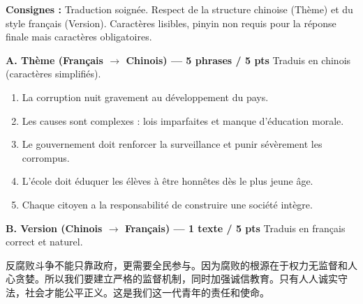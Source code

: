 \documentclass[11pt]{article}
\begin{document}
\begin{exercice}
\textbf{Consignes :} Traduction soignée. Respect de la structure chinoise (Thème) et du style français (Version). Caractères lisibles, pinyin non requis pour la réponse finale mais caractères obligatoires.

\textbf{A. Thème (Français $\rightarrow$ Chinois) — 5 phrases / 5 pts}
Traduis en chinois (caractères simplifiés).
\begin{enumerate}
    \item La corruption nuit gravement au développement du pays.
    \item Les causes sont complexes : lois imparfaites et manque d'éducation morale.
    \item Le gouvernement doit renforcer la surveillance et punir sévèrement les corrompus.
    \item L'école doit éduquer les élèves à être honnêtes dès le plus jeune âge.
    \item Chaque citoyen a la responsabilité de construire une société intègre.
\end{enumerate}

\textbf{B. Version (Chinois $\rightarrow$ Français) — 1 texte / 5 pts}
Traduis en français correct et naturel.
\begin{textebox}
反腐败斗争不能只靠政府，更需要全民参与。因为腐败的根源在于权力无监督和人心贪婪。所以我们要建立严格的监督机制，同时加强诚信教育。只有人人诚实守法，社会才能公平正义。这是我们这一代青年的责任和使命。
\end{textebox}
\end{exercice}
\end{document}
